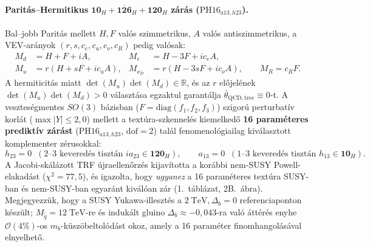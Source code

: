\documentclass[11pt,a4paper]{article}
\begin{document}
\paragraph{Paritás--Hermitikus $\mathbf{10}_H + \overline{\mathbf{126}}_H + \mathbf{120}_H$ zárás ($\mathrm{PH16}_{a13,h23}$).}
Bal--jobb Paritás mellett $H, F$ valós szimmetrikus, $A$ valós antiszimmetrikus, a VEV-arányok $(r, s, c_e, c_u, c_\nu, c_R)$ pedig valósak:
\begin{equation}
\begin{aligned}
    M_d &= H + F + iA, & M_e &= H - 3F + ic_e A, \\
    M_u &= r(H + sF + ic_u A), & M_{\nu_D} &= r(H - 3sF + ic_\nu A), \qquad M_R = c_R F.
\end{aligned}
\label{eq:ph-master-hu}
\end{equation}
A hermiticitás miatt $\det(M_u)\det(M_d) \in \mathbb{R}$, és az $r$ előjelének $\det(M_u)\det(M_d) > 0$ választása egzaktul garantálja $\bar\theta_{\mathrm{QCD,tree}} \equiv 0$-t. A veszteségmentes $SO(3)$ bázisban ($F = \mathrm{diag}(f_1, f_2, f_3)$) szigorú perturbatív korlát ($\max|Y| \le 2{,}0$) mellett a textúra-szkennelés kiemelkedő \textbf{16 paraméteres prediktív zárást} ($\mathrm{PH16}_{a13,h23}$, $\mathrm{dof} = 2$) talál fenomenológiailag kiválasztott komplementer zérusokkal:
\begin{equation}
    h_{23} = 0 \;\;(\text{2--3 keveredés tisztán } i a_{23} \in \mathbf{120}_H), \qquad a_{13} = 0 \;\;(\text{1--3 keveredés tisztán } h_{13} \in \mathbf{10}_H).
    \label{eq:ph16-zeros-hu}
\end{equation}
A Jacobi-skálázott TRF újraellenőrzés kijavította a korábbi nem-SUSY Powell-elakadást ($\chi^2 = 77{,}5$), és igazolta, hogy \emph{ugyanez} a 16 paraméteres textúra SUSY-ban és nem-SUSY-ban egyaránt kiválóan zár (1.~táblázat, 2B.~ábra). Megjegyezzük, hogy a SUSY Yukawa-illesztés a $2\;\mathrm{TeV}, \Delta_b = 0$ referenciaponton készült; $M_{\tilde q} = 12\;\mathrm{TeV}$-re és indukált gluino $\Delta_b \approx -0{,}043$-ra való áttérés enyhe $\mathcal{O}(4\%)$-os $m_b$-küszöbeltolódást okoz, amely a 16 paraméter finomhangolásával elnyelhető.
\end{document}
